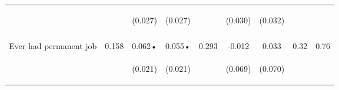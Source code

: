 \begin{tabular}{lcccccccc}
 & \begin{footnotesize}\end{footnotesize} & \begin{footnotesize}(0.027)\end{footnotesize} & \begin{footnotesize}(0.027)\end{footnotesize} & \begin{footnotesize}\end{footnotesize} & \begin{footnotesize}(0.030)\end{footnotesize} & \begin{footnotesize}(0.032)\end{footnotesize} & \begin{footnotesize}\end{footnotesize} & \begin{footnotesize}\end{footnotesize}\\
 & \begin{footnotesize}\end{footnotesize} & \begin{footnotesize}[0.021]\end{footnotesize} & \begin{footnotesize}[0.021]\end{footnotesize} & \begin{footnotesize}\end{footnotesize} & \begin{footnotesize}[0.505]\end{footnotesize} & \begin{footnotesize}[0.410]\end{footnotesize} & \begin{footnotesize}\end{footnotesize} & \begin{footnotesize}\end{footnotesize}\\
\noalign{\smallskip}Ever had permanent job & 0.158 & 0.062• & 0.055• & 0.293 & -0.012 & 0.033 & 0.32 & 0.76\\
 & \begin{footnotesize}\end{footnotesize} & \begin{footnotesize}(0.021)\end{footnotesize} & \begin{footnotesize}(0.021)\end{footnotesize} & \begin{footnotesize}\end{footnotesize} & \begin{footnotesize}(0.069)\end{footnotesize} & \begin{footnotesize}(0.070)\end{footnotesize} & \begin{footnotesize}\end{footnotesize} & \begin{footnotesize}\end{footnotesize}\\

\end{tabular}
